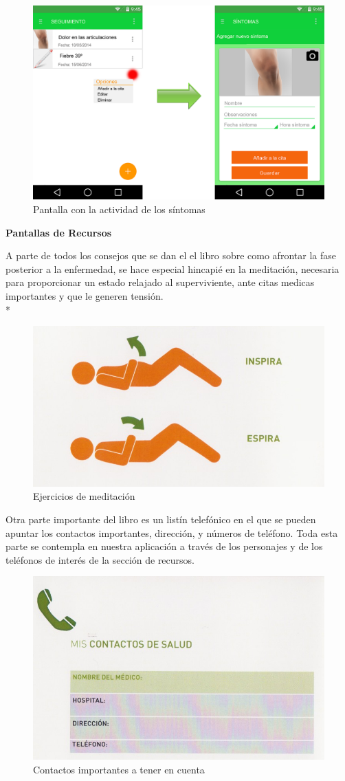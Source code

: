 \documentclass[../pfc.tex]{subfiles}
\begin{document}
		\begin{figure}[H]
			\centering
			\includegraphics[width=0.7\linewidth]{../images/sintomas}
			\caption{Pantalla con la actividad de los síntomas}
			\label{fig:sintomas}
		\end{figure}
		
		
		\textbf{Pantallas de Recursos}
		
		A parte de todos los consejos que se dan el el libro sobre como afrontar la fase posterior a la enfermedad, se hace especial hincapié en la meditación, necesaria para proporcionar un estado relajado al superviviente, ante citas medicas importantes y que le generen tensión.\\*
		
		\begin{figure}[H]
			\centering
			\includegraphics[width=0.7\linewidth]{../folleto/008_corto}
			\caption{Ejercicios de meditación}
			\label{fig:meditacion}
		\end{figure}
		
		Otra parte importante del libro es un listín telefónico en el que se pueden apuntar los contactos importantes, dirección, y números de teléfono. Toda esta parte se contempla en nuestra aplicación a través de los personajes y de los teléfonos de interés de la sección de recursos. 
		
		\begin{figure}[H]
			\centering
			\includegraphics[width=0.5\linewidth]{../folleto/016_corto}
			\caption{Contactos importantes a tener en cuenta}
			\label{fig:contactos}
		\end{figure}
		
\end{document}
